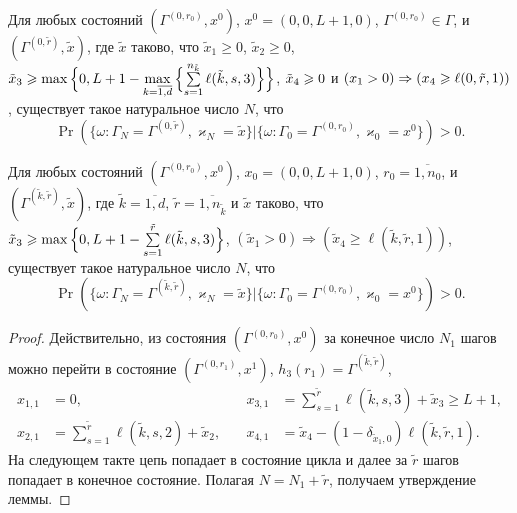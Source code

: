 \documentclass{report}
\begin{document}
\begin{lemma}
Для любых состояний $(\Gamma^{(0,r_0)},x^0)$, $x^0=(0,0,L+1,0)$, $\Gamma^{(0,r_0)} \in \Gamma$, и
$(\Gamma^{(0,\tilde{r})},\tilde{x})$,
где $\tilde{x}$ таково, что $\tilde{x}_1 \geqslant 0$, $\tilde{x}_2\geqslant 0$, $\tilde{x}_3\hm\geqslant \max{}\Bigl\{0,L+1\hm-\max\limits_{k=\overline{1,d}}{\Bigl\{\sum\limits_{s=1}^{n_{\tilde{k}}} \ell(\tilde{k},s,3)\Bigr\}}\Bigr\}$, $\tilde{x}_4\hm\geqslant 0$ и $(x_1 > 0)\hm\Rightarrow (x_4\geqslant \ell(0,\tilde{r},1))$, существует такое натуральное число $N$, что 
\begin{equation*}
\Pr(\{\omega\colon \Gamma_{N}=\Gamma^{(0,\tilde{r} )}, \varkappa_{N}=\tilde{x}\}|\{\omega\colon 
\Gamma_{0}=\Gamma^{(0,r_0)}, \varkappa_{0}=x^0\})>0.
\end{equation*}
\end{lemma}

\begin{lemma}
Для любых состояний $(\Gamma^{(0,r_0)},x^0)$, $x_0=(0,0,L+1,0)$, $r_0=\overline{1,n_0}$, и
$(\Gamma^{(\tilde{k},\tilde{r})},\tilde{x})$,
где $\tilde{k}=\overline{1,d}$, $\tilde{r} = \overline{1,n_{\tilde{k}}}$ и $\tilde{x}$ таково, что $\tilde{x}_3\geqslant \max{\Bigl\{0,L+1-\sum\limits_{s=1}^{\tilde{r}}\ell(\tilde{k},s,3)\Bigr\}}$,
$(\tilde{x}_1>0) \Rightarrow (\tilde{x}_4\geqslant \ell(\tilde{k},\tilde{r},1))$, существует такое натуральное число $N$, что 
\begin{equation*}
\Pr(\{\omega\colon \Gamma_{N}=\Gamma^{(\tilde{k},\tilde{r} )}, \varkappa_{N}=\tilde{x}\}|\{\omega\colon 
\Gamma_{0}=\Gamma^{(0,r_0)}, \varkappa_{0}=x^0\})>0.
\end{equation*}
\label{last:lemma}
\end{lemma}
\begin{proof}
Действительно, из состояния $(\Gamma^{(0,r_0)},x^0)$ за конечное число $N_1$ шагов можно перейти в состояние $(\Gamma^{(0,r_1)},x^1)$, $h_3(r_1)=\Gamma^{(\tilde{k},\tilde{r})}$,
\begin{align*}
x_{1,1}&=0,& \quad x_{3,1}&=\sum_{s=1}^{\tilde{r}} \ell(\tilde{k},s,3) +\tilde{x}_3\geqslant L+1, \\
x_{2,1}&=\sum_{s=1}^{\tilde{r}} \ell(\tilde{k},s,2) + \tilde{x}_2,& \quad x_{4,1}&=\tilde{x}_4 -  (1- \delta_{\tilde{x}_1,0}) \ell(\tilde{k},\tilde{r},1).
\end{align*}
На следующем такте цепь попадает в состояние цикла и далее за $\tilde{r}$ шагов попадает в конечное состояние. Полагая $N=N_1+\tilde{r}$, получаем утверждение леммы.
\end{proof}
\end{document}
